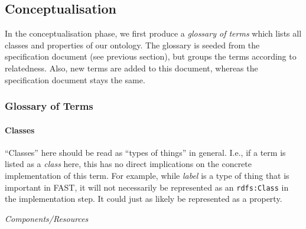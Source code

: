 \documentclass{fast_latex}
\begin{document}
\doublespacing


\subsection{Conceptualisation} %
\label{sub:conceptualisation}

In the conceptualisation phase, we first produce a \emph{glossary of terms} which lists all classes and properties of our ontology. The glossary is seeded from the specification document (see previous section), but groups the terms according to relatedness. Also, new terms are added to this document, whereas the specification document stays the same.

\subsubsection{Glossary of Terms} %
\label{ssub:glossary_of_terms}

\paragraph{Classes} %
\label{par:classes}

``Classes'' here should be read as ``types of things'' in general. I.e., if a term is listed as a \emph{class} here, this has no direct implications on the concrete implementation of this term. For example, while \emph{label} is a type of thing that is important in FAST, it will not necessarily be represented as an \texttt{rdfs:Class} in the implementation step. It could just as likely be represented as a property.

\emph{Components/Resources}
\end{document}
